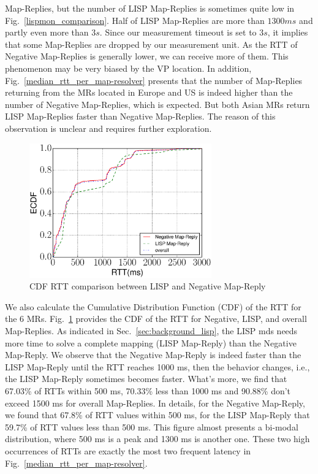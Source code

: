 Map-Replies, but the number of LISP Map-Replies is sometimes quite low in
Fig.~\ref{lispmon_comparison}. Half of LISP Map-Replies are more than $1300 ms$
and partly even more than $3 s$. Since our measurement timeout is set to $3 s$,
it implies that some Map-Replies are dropped by our measurement unit.  As the
RTT of Negative Map-Replies is generally lower, we can receive more of them. This
phenomenon may be very biased by the VP location. %
In addition, Fig.~\ref{median_rtt_per_map-resolver} presents that the number of
Map-Replies returning from the MRs  located in Europe and US is indeed higher
than the number of Negative Map-Replies, which is expected. But both Asian MRs
return LISP Map-Replies faster than Negative Map-Replies. The reason of this 
observation is unclear and requires further exploration.

\begin{figure}[!t]
        \centering
        \includegraphics[width=0.7\textwidth]{Pics/ecdf_of_RTT.eps}
        \caption{CDF RTT comparison between LISP and Negative Map-Reply}
        \label{ecdf_rtt_lisp_negative}
\end{figure}
We also calculate the Cumulative Distribution Function (CDF) of the
RTT for the 6 MRs. Fig.~\ref{ecdf_rtt_lisp_negative} provides the CDF of the
RTT for Negative, LISP, and overall Map-Replies. As indicated in
Sec.~\ref{sec:background_lisp}, the LISP \acrshort{mds} needs more time to solve a
complete mapping (LISP Map-Reply) than the Negative Map-Reply.  We observe that
the Negative Map-Reply is indeed faster than the LISP Map-Reply until the RTT
reaches 1000 ms, then the behavior changes, i.e., the LISP Map-Reply
sometimes becomes faster. What's more, we find that 67.03\% of RTTs within
500 ms, 70.33\% less than 1000 ms and 90.88\% don't exceed 1500 ms
for overall Map-Replies. In details, for the Negative Map-Reply, we found that
67.8\% of RTT values within 500 ms, for the LISP Map-Reply that 59.7\% of
RTT values less than 500 ms. This figure almost presents a bi-modal
distribution, where 500 ms is a peak and 1300 ms is another one. These two
high occurrences of RTTs are exactly the most two frequent latency in
Fig.~\ref{median_rtt_per_map-resolver}.


